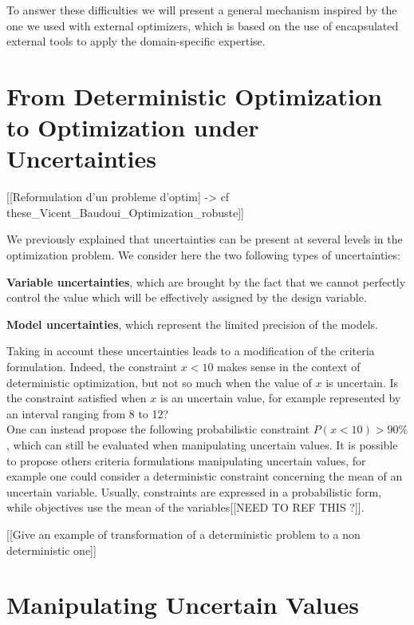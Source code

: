 To answer these difficulties we will present a general mechanism inspired by the one we used with external optimizers, which is based on the use of encapsulated external tools to apply the domain-specific expertise.

\section{From Deterministic Optimization to Optimization under Uncertainties}

[[Reformulation d'un probleme d'optim] -> cf these_Vicent_Baudoui_Optimization_robuste]]

We previously explained that uncertainties can be present at several levels in the optimization problem. We consider here the two following types of uncertainties:
\begin{compactitem}
\item \textbf{Variable uncertainties}, which are brought by the fact that we cannot perfectly control the value which will be effectively assigned by the design variable.
\item \textbf{Model uncertainties}, which represent the limited precision of the models.
\end{compactitem}

Taking in account these uncertainties leads to a modification of the criteria formulation. Indeed, the constraint $x < 10$ makes sense in the context of deterministic optimization, but not so much when the value of $x$ is uncertain. Is the constraint satisfied when $x$ is an uncertain value, for example represented by an interval ranging from 8 to 12?\\
One can instead propose the following probabilistic constraint $P(x < 10) > 90\%$, which can still be evaluated when manipulating uncertain values. It is possible to propose others criteria formulations manipulating uncertain values, for example one could consider a deterministic constraint concerning the mean of an uncertain variable. Usually, constraints are expressed in a probabilistic form, while objectives use the mean of the variables[[NEED TO REF THIS ?]].

[[Give an example of transformation of a deterministic problem to a non deterministic one]]

\section{Manipulating Uncertain Values}

